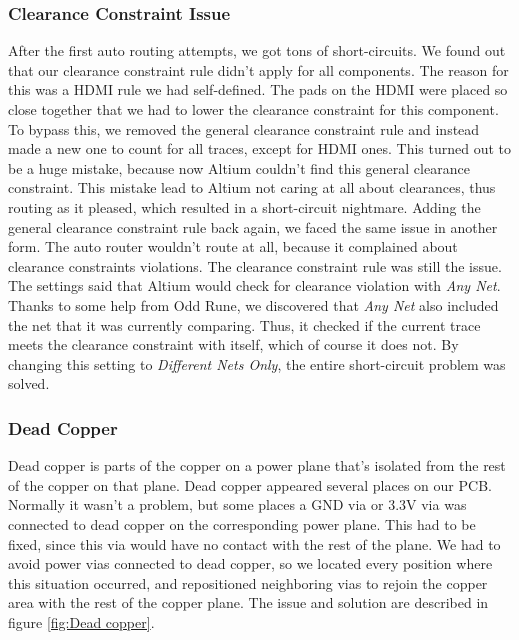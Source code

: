 \subsubsection{Clearance Constraint Issue}
After the first auto routing attempts, we got tons of short-circuits. We found out that our clearance constraint rule didn't apply for all components. The reason for this was a HDMI rule we had self-defined. The pads on the HDMI were placed so close together that we had to lower the clearance constraint for this component. To bypass this, we removed the general clearance constraint rule and instead made a new one to count for all traces, except for HDMI ones. This turned out to be a huge mistake, because now Altium couldn't find this general clearance constraint. This mistake lead to Altium not caring at all about clearances, thus routing as it pleased, which resulted in a short-circuit nightmare.
\newline
\newline
Adding the general clearance constraint rule back again, we faced the same issue in another form. The auto router wouldn't route at all, because it complained about clearance constraints violations.
\newline
The clearance constraint rule was still the issue. The settings said that Altium would check for clearance violation with \emph{Any Net}. Thanks to some help from Odd Rune, we discovered that \emph{Any Net} also included the net that it was currently comparing. Thus, it checked if the current trace meets the clearance constraint with itself, which of course it does not. By changing this setting to \emph{Different Nets Only}, the entire short-circuit problem was solved. 

\subsubsection{Dead Copper}
Dead copper is parts of the copper on a power plane that's isolated from the rest of the copper on that plane. 
Dead copper appeared several places on our PCB. Normally it wasn't a problem, but some places a GND via or 3.3V via was connected to dead copper on the corresponding power plane. This had to be fixed, since this via would have no contact with the rest of the plane.
\newline
We had to avoid power vias connected to dead copper, so we located every position where this situation occurred, and repositioned neighboring vias to rejoin the copper area with the rest of the copper plane. The issue and solution are described in figure \ref{fig:Dead copper}.

